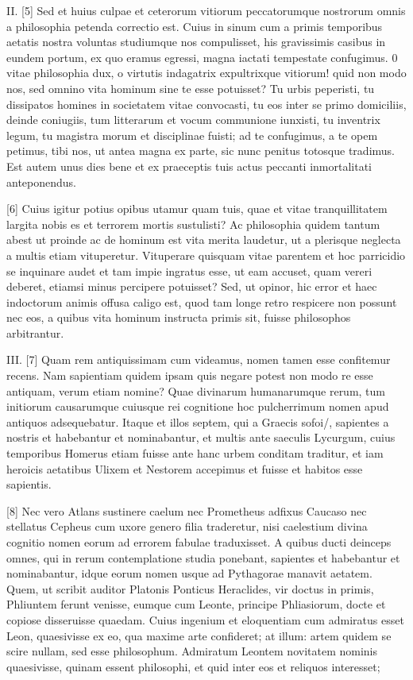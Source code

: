 \documentclass[11pt,b5paper,twoside]{book}
\begin{document}
II. [5] Sed et huius culpae et ceterorum vitiorum peccatorumque nostrorum omnis a philosophia petenda correctio est. Cuius in sinum cum a primis temporibus aetatis nostra voluntas studiumque nos compulisset, his gravissimis casibus in eundem portum, ex quo eramus egressi, magna iactati tempestate confugimus. 0 vitae philosophia dux, o virtutis indagatrix expultrixque vitiorum! quid non modo nos, sed omnino vita hominum sine te esse potuisset? Tu urbis peperisti, tu dissipatos homines in societatem vitae convocasti, tu eos inter se primo domiciliis, deinde coniugiis, tum litterarum et vocum communione iunxisti, tu inventrix legum, tu magistra morum et disciplinae fuisti; ad te confugimus, a te opem petimus, tibi nos, ut antea magna ex parte, sic nunc penitus totosque tradimus. Est autem unus dies bene et ex praeceptis tuis actus peccanti inmortalitati anteponendus.

[6] Cuius igitur potius opibus utamur quam tuis, quae et vitae tranquillitatem largita nobis es et terrorem mortis sustulisti? Ac philosophia quidem tantum abest ut proinde ac de hominum est vita merita laudetur, ut a plerisque neglecta a multis etiam vituperetur. Vituperare quisquam vitae parentem et hoc parricidio se inquinare audet et tam impie ingratus esse, ut eam accuset, quam vereri deberet, etiamsi minus percipere potuisset? Sed, ut opinor, hic error et haec indoctorum animis offusa caligo est, quod tam longe retro respicere non possunt nec eos, a quibus vita hominum instructa primis sit, fuisse philosophos arbitrantur.

III. [7] Quam rem antiquissimam cum videamus, nomen tamen esse confitemur recens. Nam sapientiam quidem ipsam quis negare potest non modo re esse antiquam, verum etiam nomine? Quae divinarum humanarumque rerum, tum initiorum causarumque cuiusque rei cognitione hoc pulcherrimum nomen apud antiquos adsequebatur. Itaque et illos septem, qui a Graecis sofoi/, sapientes a nostris et habebantur et nominabantur, et multis ante saeculis Lycurgum, cuius temporibus Homerus etiam fuisse ante hanc urbem conditam traditur, et iam heroicis aetatibus Ulixem et Nestorem accepimus et fuisse et habitos esse sapientis.

[8] Nec vero Atlans sustinere caelum nec Prometheus adfixus Caucaso nec stellatus Cepheus cum uxore genero filia traderetur, nisi caelestium divina cognitio nomen eorum ad errorem fabulae traduxisset. A quibus ducti deinceps omnes, qui in rerum contemplatione studia ponebant, sapientes et habebantur et nominabantur, idque eorum nomen usque ad Pythagorae manavit aetatem. Quem, ut scribit auditor Platonis Ponticus Heraclides, vir doctus in primis, Phliuntem ferunt venisse, eumque cum Leonte, principe Phliasiorum, docte et copiose disseruisse quaedam. Cuius ingenium et eloquentiam cum admiratus esset Leon, quaesivisse ex eo, qua maxime arte confideret; at illum: artem quidem se scire nullam, sed esse philosophum. Admiratum Leontem novitatem nominis quaesivisse, quinam essent philosophi, et quid inter eos et reliquos interesset;
\end{document}
